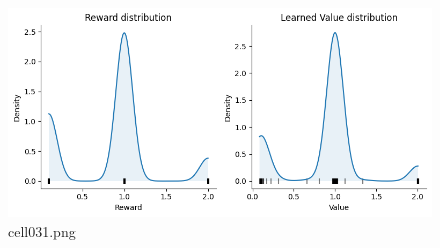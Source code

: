 \begin{figure}[ht]
	\centering
	\includegraphics[scale=0.8, max width=\linewidth]{./fig/bayesian-brain/quantile-expectile-regression/cell031.png}
	\caption{cell031.png}
	\label{cell031.png}
\end{figure}